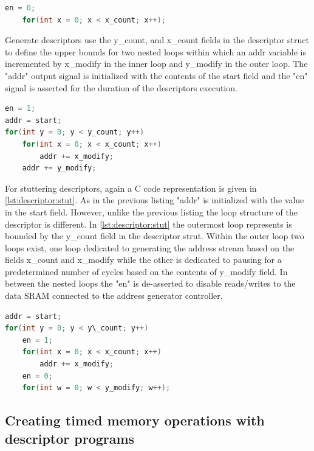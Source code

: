 \begin{lstlisting}[language=C, caption=Descriptor as a set of loops, label={lst:descriptor:wait}]
    en = 0;
    for(int x = 0; x < x_count; x++);
\end{lstlisting}

Generate descriptors use the y\_count, and x\_count fields in the descriptor struct
to define the upper bounds for two nested loops within which an addr
variable is incremented by x\_modify in the inner loop and y\_modify in the
outer loop. The "addr" output signal is initialized with the contents of the
start field and the "en" signal is asserted for the duration of the descriptors
execution.

\begin{lstlisting}[language=C, caption=Descriptor as a set of loops, label={lst:descriptor:generator}]
en = 1;
addr = start;
for(int y = 0; y < y_count; y++)
    for(int x = 0; x < x_count; x++)
        addr += x_modify;
    addr += y_modify;
\end{lstlisting}

For stuttering descriptors, again a C code representation is given in
\autoref{lst:descriptor:stut}. As in the previous listing "addr" is initialized
with the value in the start field. However, unlike the previous listing the loop
structure of the descriptor is different. In \autoref{lst:descriptor:stut} the
outermost loop represents is bounded by the y\_count field in the descriptor
strut. Within the outer loop two loops exist, one loop dedicated to generating
the address stream based on the fields x\_count and x\_modify while the other is
dedicated to pausing for a predetermined number of cycles based on the contents
of y\_modify field. In between the nested loops the "en" is de-asserted to
disable reads/writes to the data SRAM connected to the address generator
controller.

\begin{lstlisting}[language=C, caption=Descriptor as a set of loops, label={lst:descriptor:stut}]
addr = start;
for(int y = 0; y < y\_count; y++)
    en = 1;
    for(int x = 0; x < x_count; x++)
        addr += x_modify;
    en = 0;
    for(int w = 0; w < y_modify; w++);
\end{lstlisting}

\subsection{Creating timed memory operations with descriptor programs}
\label{chap:sams:memory_transactions}

